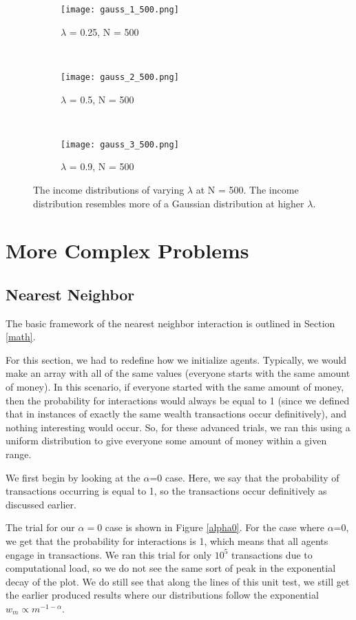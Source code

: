 \documentclass[11pt]{article}
\begin{document}
\begin{figure*}[h!]
	\begin{subfigure}{0.3\textwidth}
		\texttt{[image: gauss\_1\_500.png]}
		\caption{$\lambda$ = 0.25, N = 500}
	\end{subfigure}
	~
	\begin{subfigure}{0.3\textwidth}
		\texttt{[image: gauss\_2\_500.png]}
		\caption{$\lambda$ = 0.5, N = 500}
	\end{subfigure}
	~
	\begin{subfigure}{0.3\textwidth}
		\texttt{[image: gauss\_3\_500.png]}
		\caption{$\lambda$ = 0.9, N = 500}
	\end{subfigure}
	\caption{The income distributions of varying $\lambda$ at N = 500. The income distribution resembles more of a Gaussian distribution at higher $\lambda$.}
	\label{gauss}
\end{figure*}

\section{More Complex Problems}
\subsection{Nearest Neighbor}
The basic framework of the nearest neighbor interaction is outlined in Section \ref{math}. 

For this section, we had to redefine how we initialize agents. Typically, we would make an array with all of the same values (everyone starts with the same amount of money). In this scenario, if everyone started with the same amount of money, then the probability for interactions would always be equal to 1 (since we defined that in instances of exactly the same wealth transactions occur definitively), and nothing interesting would occur. So, for these advanced trials, we ran this using a uniform distribution to give everyone some amount of money within a given range. 

We first begin by looking at the $\alpha$=0 case. Here, we say that the probability of transactions occurring is equal to 1, so the transactions occur definitively as discussed earlier. 

The trial for our $\alpha=0$ case is shown in Figure \ref{alpha0}. For the case where $\alpha$=0, we get that the probability for interactions is 1, which means that all agents engage in transactions. We ran this trial for only $10^5$ transactions due to computational load, so we do not see the same sort of peak in the exponential decay of the plot. We do still see that along the lines of this unit test, we still get the earlier produced results where our distributions follow the exponential $w_m \propto m^{-1-\alpha}$. 
\end{document}
